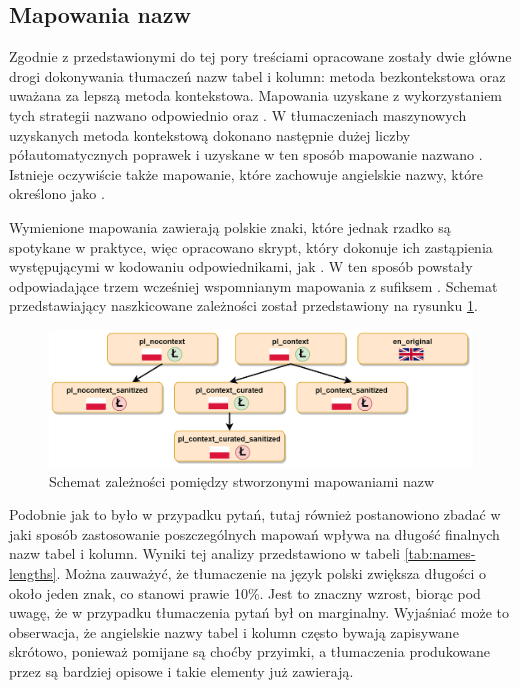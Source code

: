 \subsection{Mapowania nazw}
Zgodnie z przedstawionymi do tej pory treściami opracowane zostały dwie główne drogi dokonywania tłumaczeń nazw tabel i kolumn: metoda bezkontekstowa oraz uważana za lepszą metoda kontekstowa. Mapowania uzyskane z wykorzystaniem tych strategii nazwano odpowiednio  oraz . W tłumaczeniach maszynowych uzyskanych metoda kontekstową dokonano następnie dużej liczby półautomatycznych poprawek i uzyskane w ten sposób mapowanie nazwano . Istnieje oczywiście także mapowanie, które zachowuje angielskie nazwy, które określono jako .

Wymienione mapowania zawierają polskie znaki, które jednak rzadko są spotykane w praktyce, więc opracowano skrypt, który dokonuje ich zastąpienia występującymi w kodowaniu  odpowiednikami, jak . W ten sposób powstały odpowiadające trzem wcześniej wspomnianym mapowania z sufiksem . Schemat przedstawiający naszkicowane zależności został przedstawiony na rysunku \ref{fig:mappings}.

\begin{figure}[ht!]
  \centering
  \includegraphics[width=1.0\linewidth]{images/mappings.png}
  \caption{Schemat zależności pomiędzy stworzonymi mapowaniami nazw}
  \label{fig:mappings}
\end{figure}

Podobnie jak to było w przypadku pytań, tutaj również postanowiono zbadać w jaki sposób zastosowanie poszczególnych mapowań wpływa na długość finalnych nazw tabel i kolumn. Wyniki tej analizy przedstawiono w tabeli \ref{tab:names-lengths}. Można zauważyć, że tłumaczenie na język polski zwiększa długości o około jeden znak, co stanowi prawie 10\%. Jest to znaczny wzrost, biorąc pod uwagę, że w przypadku tłumaczenia pytań był on marginalny. Wyjaśniać może to obserwacja, że angielskie nazwy tabel i kolumn często bywają zapisywane skrótowo, ponieważ pomijane są choćby przyimki, a tłumaczenia produkowane przez  są bardziej opisowe i takie elementy już zawierają.

